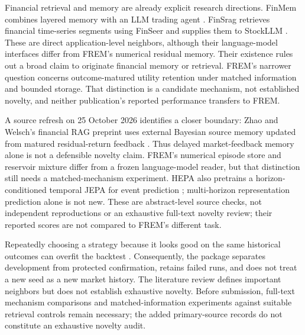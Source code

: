 \documentclass[11pt,a4paper]{article}
\begin{document}
Financial retrieval and memory are already explicit research directions. FinMem combines layered memory with an LLM trading agent \citep{yu2023finmem}. FinSrag retrieves financial time-series segments using FinSeer and supplies them to StockLLM \citep{xiao2025finsrag}. These are direct application-level neighbors, although their language-model interfaces differ from FREM's numerical residual memory. Their existence rules out a broad claim to originate financial memory or retrieval. FREM's narrower question concerns outcome-matured utility retention under matched information and bounded storage. That distinction is a candidate mechanism, not established novelty, and neither publication's reported performance transfers to FREM.

A source refresh on 25 October 2026 identifies a closer boundary: Zhao and
Welsch's financial RAG preprint uses external Bayesian source memory updated
from matured residual-return feedback \citep{zhao2026source}. Thus delayed
market-feedback memory alone is not a defensible novelty claim. FREM's numerical
episode store and reservoir mixture differ from a frozen language-model reader,
but that distinction still needs a matched-mechanism experiment. HEPA also
pretrains a horizon-conditioned temporal JEPA for event prediction
\citep{petersen2026hepa}; multi-horizon representation prediction alone is not
new. These are abstract-level source checks, not independent reproductions or
an exhaustive full-text novelty review; their reported scores are not compared
to FREM's different task.

Repeatedly choosing a strategy because it looks good on the same historical outcomes can overfit the backtest \citep{bailey2015}. Consequently, the package separates development from protected confirmation, retains failed runs, and does not treat a new seed as a new market history. The literature review defines important neighbors but does not establish exhaustive novelty. Before submission, full-text mechanism comparisons and matched-information experiments against suitable retrieval controls remain necessary; the added primary-source records do not constitute an exhaustive novelty audit.
\end{document}
